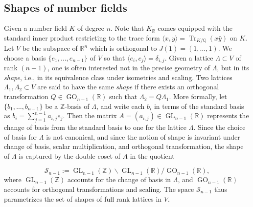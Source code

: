 \documentclass[table]{amsart}
\newcommand{\Z}{\mathbb{Z}}
\newcommand{\Q}{\mathbb{Q}}
\newcommand{\op}[1]{\operatorname{#1}}
\numberwithin{equation}{section}
\begin{document}
\subsection{Shapes of number fields}

\par Given a number field $K$ of degree $n$. Note that $K_{\mathbb{R}}$ comes equipped with the standard inner product restricting to the trace form $\langle x,y \rangle =\op{Tr}_{K/\Q}(x\bar{y})$ on $K$. Let $V$ be the subspace of $\mathbb{R}^n$ which is orthogonal to $J(1)=(1, \dots, 1)$. We choose a basis $\{e_1, \dots, e_{n-1}\}$ of $V$ so that $\langle e_i, e_j\rangle=\delta_{i,j}$. Given a lattice $\Lambda\subset V$ of rank $(n-1)$, one is often interested not in the precise geometry of $\Lambda$, but in its \emph{shape}, i.e., in its equivalence class under isometries and scaling. Two lattices $\Lambda_1, \Lambda_2 \subset V$ are said to have the same \emph{shape} if there exists an orthogonal transformation $Q \in \operatorname{GO}_{n-1}(\mathbb{R})$ such that $\Lambda_2 =  Q \Lambda_1$. More formally, let $\{b_1, \dots, b_{n-1}\}$ be a $\Z$-basis of $\Lambda$, and write each $b_i$ in terms of the standard basis as
$
b_i = \sum_{j=1}^{n-1} a_{i,j} e_j
$. Then the matrix $A = (a_{i,j}) \in \operatorname{GL}_{n-1}(\mathbb{R})$ represents the change of basis from the standard basis to one for the lattice $\Lambda$. Since the choice of basis for $\Lambda$ is not canonical, and since the notion of shape is invariant under change of basis, scalar multiplication, and orthogonal transformation, the shape of $\Lambda$ is captured by the double coset of $A$ in the quotient

$$
\mathcal{S}_{n-1} := \operatorname{GL}_{n-1}(\mathbb{Z}) \backslash \operatorname{GL}_{n-1}(\mathbb{R}) / \operatorname{GO}_{n-1}(\mathbb{R}),
$$
\noindent where $\operatorname{GL}_{n-1}(\mathbb{Z})$ accounts for the change of basis in $\Lambda$, and $\operatorname{GO}_{n-1}(\mathbb{R})$ accounts for orthogonal transformations and scaling. The space $\mathcal{S}_{n-1}$ thus parametrizes the set of shapes of full rank lattices in $V$.
\end{document}
